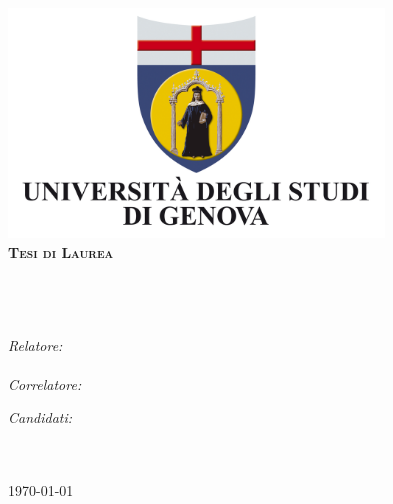 \documentclass[12pt, twosides]{Thesis} %
\begin{document}
\begin{titlepage}
\begin{center}

\includegraphics[width=9.98cm,height=6.1cm]{Figures/UNIGE.jpg}\\[1cm]

\textsc{\Large \textbf{Tesi di Laurea}}\\[0.5cm] %

\HRule \\[0.4cm] %
{\huge \bfseries \ttitle}\\[0.4cm] %
\HRule \\[1.0cm] %
 
\begin{minipage}{0.45\textwidth}
\begin{flushleft} \large
\emph{Relatore:} \\
\href{http://goo.gl/JQlltW}{\supname} \\ %
\emph{Correlatore:} \\
{\crelator}
\end{flushleft}
\end{minipage}
\begin{minipage}{0.45\textwidth}
\begin{flushright} \large\emph{Candidati:}\\
{\nauthors} %
\end{flushright}
\end{minipage}\\[4.5cm]
 
\deptname\\[.5cm] %
 
{\today}\\[4cm] %
 
\vfill
\end{center}

\end{titlepage}
\end{document}
